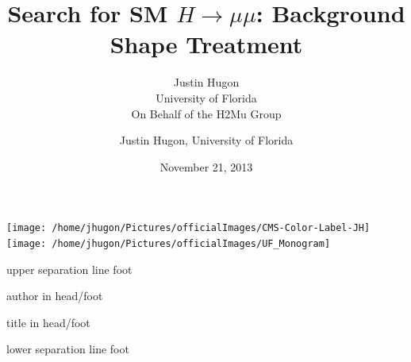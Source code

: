 \documentclass{beamer}
\title{Search for SM $H \rightarrow \mu \mu$: Background Shape Treatment}
\date{November 21, 2013}
\author{Justin Hugon \\ University of Florida \vspace{0.5em} \\ On Behalf of the H2Mu Group}
\begin{document}
\begin{frame}
  \maketitle
\vspace{-1em}
  \texttt{[image: /home/jhugon/Pictures/officialImages/CMS-Color-Label-JH]}
  \hfill
  \texttt{[image: /home/jhugon/Pictures/officialImages/UF\_Monogram]}
\end{frame}

\makeatletter
{}
{
    \begin{beamercolorbox}[colsep=1.5pt]{upper separation line foot}
    \end{beamercolorbox}
    \begin{beamercolorbox}[ht=2.5ex,dp=1.125ex,%
      leftskip=.3cm,rightskip=.3cm plus1fil]{author in head/foot}%
      \hfill%
      {\insertshortinstitute}%
    \end{beamercolorbox}%
    \begin{beamercolorbox}[ht=2.5ex,dp=1.125ex,%
      leftskip=.3cm,rightskip=.3cm plus1fil]{title in head/foot}%
      {\insertshorttitle \hfill \insertframenumber}%
    \end{beamercolorbox}%
    \begin{beamercolorbox}[colsep=1.5pt]{lower separation line foot}
    \end{beamercolorbox}
}
\makeatother

\author{Justin Hugon, University of Florida}



\end{document}
